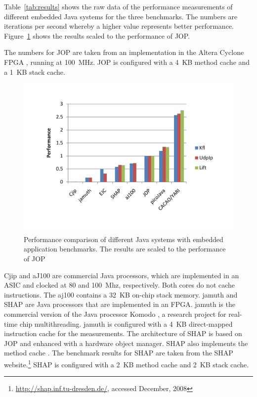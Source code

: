 Table~\ref{tab:results} shows the raw data of the performance
measurements of different embedded Java systems for the three
benchmarks. The numbers are iterations per second whereby a higher
value represents better performance. Figure~\ref{fig:bench} shows the
results scaled to the performance of JOP.

The numbers for JOP are taken from an implementation in the Altera
Cyclone FPGA \cite{AltCyc}, running at 100~MHz. JOP is configured
with a 4~KB method cache and a 1~KB stack cache.

\begin{figure}[t]
    \centering
    \includegraphics[width=\excelwidth]{results/perf}
    \caption{Performance comparison of different Java systems with
    embedded application benchmarks. The results are scaled to the performance of JOP}
    \label{fig:bench}
\end{figure}

Cjip \cite{Cjip} and aJ100 \cite{aJile} are commercial Java
processors, which are implemented in an ASIC and clocked at 80 and
100~Mhz, respectively. Both cores do not cache instructions. The
aj100 contains a 32~KB on-chip stack memory. jamuth
\cite{jamuth:jtres07} and SHAP \cite{shap} are Java processors that
are implemented in an FPGA. jamuth is the commercial version of the
Java processor Komodo \cite{komodo2003}, a research project for
real-time chip multithreading. jamuth is configured with a 4~KB
direct-mapped instruction cache for the measurements. The
architecture of SHAP is based on JOP and enhanced with a hardware
object manager. SHAP also implements the method cache
\cite{shap:mcache}. The benchmark results for SHAP are taken from the
SHAP website.\footnote{\url{http://shap.inf.tu-dresden.de/}, accessed
December, 2008} SHAP is configured with a 2~KB method cache and 2~KB
stack cache.

